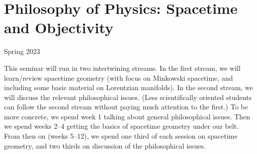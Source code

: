\documentclass[11pt]{article}
\begin{document}
\section*{Philosophy of Physics: Spacetime and Objectivity}
















Spring 2023

\medskip \noindent This seminar will run in two intertwining
streams. In the first stream, we will learn/review spacetime geometry
(with focus on Minkowski spacetime, and including some basic material
on Lorentzian manifolds). In the second stream, we will discuss the
relevant philosophical issues. (Less scientifically oriented students
can follow the second stream without paying much attention to the
first.)  To be more concrete, we spend week 1 talking about general
philosophical issues. Then we spend weeks 2--4 getting the basics of
spacetime geometry under our belt. From then on (weeks 5--12), we
spend one third of each session on spacetime geometry, and two thirds
on discussion of the philosophical issues.

\end{document}
